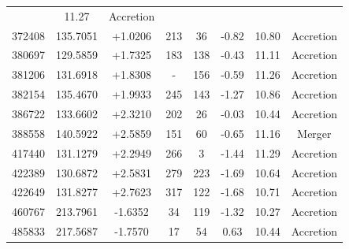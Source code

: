 \documentclass[fleqn,usenatbib]{mnras}
\begin{document}
\begin{table}
\begin{tabular*}{\linewidth}{cccccccc}
& 11.27%
& Accretion          \\
372408                    & 135.7051 & +1.0206 & 213                           & 36                          & -0.82%
& 10.80%
& Accretion          \\
380697                    & 129.5859 & +1.7325 & 183                           & 138                         & -0.43%
& 11.11%
& Accretion          \\
381206                    & 131.6918 & +1.8308 & -                           & 156                         & -0.59%
& 11.26%
& Accretion          \\
382154                    & 135.4670 & +1.9933 & 245                           & 143                         & -1.27%
& 10.86%
& Accretion          \\
386722                    & 133.6602 & +2.3210 & 202                           & 26                          & -0.03%
& 10.44%
& Accretion          \\
388558                    & 140.5922 & +2.5859 & 151                           & 60                          & -0.65%
& 11.16%
& Merger             \\
417440                    & 131.1279 & +2.2949 & 266                           & 3                           & -1.44%
& 11.29%
& Accretion          \\
422389                    & 130.6872 & +2.5831 & 279                           & 223                         & -1.69%
& 10.64%
& Accretion          \\
422649                    & 131.8277 & +2.7623 & 317                           & 122                         & -1.68%
& 10.71%
& Accretion          \\
460767                    & 213.7961 & -1.6352 & 34                            & 119                         & -1.32%
& 10.27%
& Accretion          \\
485833                    & 217.5687 & -1.7570 & 17                            & 54                          & 0.63%
& 10.44%
& Accretion         

\end{tabular*}
\end{table}

\end{document}
